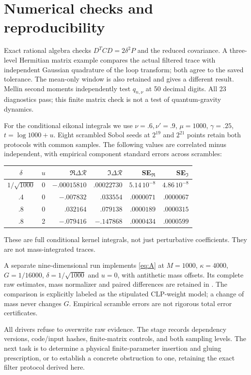 \documentclass[11pt,a4paper]{article}
\newcommand{\R}{\mathcal R}
\begin{document}
\newpage
\section{Numerical checks and reproducibility}
Exact rational algebra checks $D^TCD=2\delta^2P$ and the reduced
covariance. A three-level Hermitian matrix example compares the
actual filtered trace with independent Gaussian quadrature of the
loop transform; both agree to the saved tolerance. The mean-only
window is also retained and gives a different result. Mellin
second moments independently test $q_{n,\nu}$ at 50 decimal digits.
All 23 diagnostics pass; this finite matrix check is not a test of
quantum-gravity dynamics.

For the conditional eikonal integrals we use $\nu=.6,\nu'=.9$,
$\mu=1000$, $\gamma=.25$, $t=\log1000+u$. Eight scrambled Sobol
seeds at $2^{19}$ and $2^{21}$ points retain both protocols with
common samples. The following values are correlated minus
independent, with empirical component standard errors across
scrambles:
\begin{center}\begin{tabular}{cc rr rr}
\toprule
$\delta$&$u$&$\Re\Delta\R$&$\Im\Delta\R$&SE$_{\Re}$&SE$_{\Im}$\\
\midrule
$1/\sqrt{1000}$&0&$-.00015810$&$.00022730$&$5.14\,10^{-8}$&$4.86\,10^{-8}$\\
.4&0&$-.007832$&$.033554$&$.0000071$&$.0000067$\\
.8&0&$.032164$&$.079138$&$.0000189$&$.0000315$\\
.8&2&$-.079416$&$-.147868$&$.0000434$&$.0000599$\\
\bottomrule
\end{tabular}\end{center}
These are full conditional kernel integrals, not just perturbative
coefficients. They are not mass-integrated traces.

A separate nine-dimensional run implements \eqref{eq:A} at
$M=1000$, $\kappa=4000$, $G=1/16000$,
$\delta=1/\sqrt{1000}$ and $u=0$, with antithetic mass offsets.
Its complete raw estimates, mass normalizer and paired differences
are retained in .
The comparison is explicitly labeled as the stipulated CLP-weight
model; a change of mass never changes $G$.
Empirical scramble errors are not rigorous total error certificates.

All drivers refuse to overwrite raw evidence. The stage records
dependency versions, code/input hashes, finite-matrix controls,
and both sampling levels. The next task is to determine a physical
finite-parameter insertion and gluing prescription, or to establish
a concrete obstruction to one, retaining the exact filter protocol
derived here.
\end{document}
